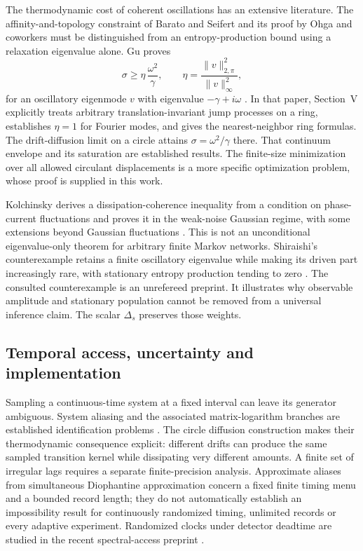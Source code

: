 The thermodynamic cost of coherent oscillations has an extensive literature.
The affinity-and-topology constraint of Barato and Seifert
\cite{rfBarato2017} and its proof by Ohga and coworkers
\cite{rfOhga2023} must be distinguished from an entropy-production bound
using a relaxation eigenvalue alone. Gu proves
\[
 \sigma\geq \eta\,\frac{\omega^2}{\gamma},
 \qquad
 \eta=\frac{\|v\|_{2,\pi}^2}{\|v\|_\infty^2},
\]
for an oscillatory eigenmode $v$ with eigenvalue $-\gamma+i\omega$
\cite{rfGu2026}. In that paper, Section~V explicitly treats arbitrary
translation-invariant jump processes on a ring, establishes $\eta=1$ for
Fourier modes, and gives the nearest-neighbor ring formulas. The drift-diffusion
limit on a circle attains $\sigma=\omega^2/\gamma$ there. That continuum
envelope and its saturation are established results. The finite-size
minimization over all allowed circulant displacements is a more specific
optimization problem, whose proof is supplied in this work.

Kolchinsky derives a dissipation-coherence inequality from a condition on
phase-current fluctuations and proves it in the weak-noise Gaussian regime,
with some extensions beyond Gaussian fluctuations \cite{paKolchinsky2026}.
This is not an unconditional eigenvalue-only theorem for arbitrary finite
Markov networks. Shiraishi's counterexample retains a finite oscillatory
eigenvalue while making its driven part increasingly rare, with stationary
entropy production tending to zero \cite{rfShiraishi2026}. The consulted
counterexample is an unrefereed preprint. It illustrates why observable
amplitude and stationary population cannot be removed from a universal
inference claim. The scalar $\Delta_s$ preserves those weights.

\subsection{Temporal access, uncertainty and implementation}

Sampling a continuous-time system at a fixed interval can leave its generator
ambiguous. System aliasing and the associated matrix-logarithm branches are
established identification problems \cite{paYue2021}. The circle diffusion
construction makes their thermodynamic consequence explicit: different drifts
can produce the same sampled transition kernel while dissipating very
different amounts. A finite set of irregular lags requires a separate
finite-precision analysis. Approximate aliases from simultaneous Diophantine
approximation concern a fixed finite timing menu and a bounded record length;
they do not automatically establish an impossibility result for continuously
randomized timing, unlimited records or every adaptive experiment. Randomized
clocks under detector deadtime are studied in the recent spectral-access
preprint \cite{rfAznagulov2026}.

